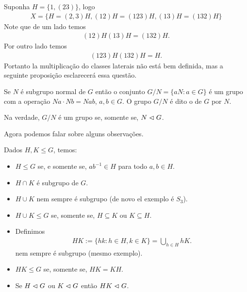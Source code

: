 Suponha $H=\{1,(23)\}$, logo
\begin{align*}
  X=\{H=(2,3)H,(12)H=(123)H,(13)H=(132)H\}
\end{align*}
Note que de um lado temos
\begin{align*}
  (12)H(13)H=(132)H.
\end{align*}
Por outro lado temos
\begin{align*}
  (123)H(132)H=H.
\end{align*}
Portanto la multiplicação do classes laterais não está bem definida, mas a seguinte proposição esclarecerá essa questão.
\begin{proposition}
  Se $N$ é subgrupo normal de $G$ então o conjunto $G/N=\{aN:a\in G\}$ é um grupo com a operação $Na\cdot Nb=Nab$, $a,b\in G$. O grupo $G/N$ é dito o  de $G$ por $N$.

  Na verdade, $G/N$ é um grupo se, somente se, $N\vartriangleleft G$. 
\end{proposition}
Agora podemos falar sobre alguns observações.

Dados $H,K\leq G$, temos:
\begin{itemize}
  \item $H\leq G$ se, e somente se, $ab^{-1}\in H$ para todo $a,b\in H$.
  \item $H\cap K$ é subgrupo de $G$.
  \item $H\cup K$ nem sempre é subgrupo (de novo el exemplo é $S_3$).

  \item $H \cup K\leq G$ se, somente se, $H\subseteq K$ ou $K\subseteq H$.
  \item Definimos
    \begin{align*}
      HK:=\{hk:h\in H,k\in K\}=\bigcup_{h\in H}hK.
    \end{align*}
    nem sempre é subgrupo (mesmo exemplo).
  \item $HK\leq G$ se, somente se, $HK=KH$.
  \item Se $H\vartriangleleft G$ ou $K\vartriangleleft G$ então $HK\vartriangleleft G$. 
\end{itemize}
